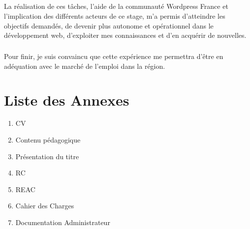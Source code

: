 \documentclass[11pt,a4paper]{report}
\begin{document}
	\paragraph*{}La réalisation de ces tâches, l'aide de la communauté Wordpress France et l'implication des différents acteurs de ce stage, m'a permis d'atteindre les objectifs demandés, de devenir plus autonome et opérationnel dans le développement web, d'exploiter mes connaissances et d'en acquérir de nouvelles.
	\paragraph*{}Pour finir, je suis convaincu que cette expérience me permettra d'être en adéquation avec le marché de l'emploi dans la région.
	


\chapter{Liste des Annexes}
	\begin{enumerate}
		\item CV
		\item Contenu pédagogique
		\item Présentation du titre
		\item RC
		\item REAC
		\item Cahier des Charges
		\item Documentation Administrateur
	\end{enumerate}


\listoffigures {}
\listoftables
\end{document}

